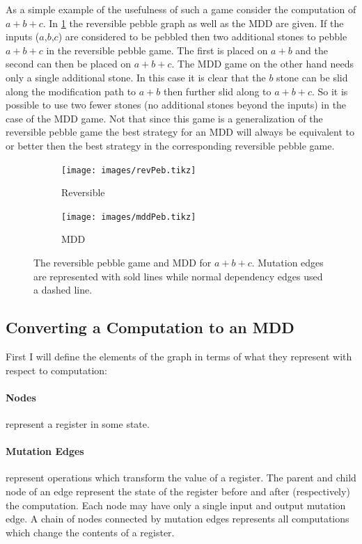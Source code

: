 As a simple example of the usefulness of such a game consider the computation
of $a+b+c$. In \cref{fig:mddExample} the reversible pebble graph as well as the
MDD are given. If the inputs ($a$,$b$,$c$) are considered to be pebbled then
two additional stones to pebble $a+b+c$ in the reversible pebble game. The
first is placed on $a+b$ and the second can then be placed on $a+b+c$. The MDD
game on the other hand needs only a single additional stone. In this case it is
clear that the $b$ stone can be slid along the modification path to $a+b$ then
further slid along to $a+b+c$. So it is possible to use two fewer stones (no
additional stones beyond the inputs) in the case of the MDD game.  Not that
since this game is a generalization of the reversible pebble game the best
strategy for an MDD will always be equivalent to or better then the best
strategy in the corresponding reversible pebble game.

\begin{figure}
  \centering
  \begin{subfigure}{0.3\textwidth}
    \texttt{[image: images/revPeb.tikz]}
    \caption{Reversible}
  \end{subfigure}
  \qquad\qquad
  \begin{subfigure}{0.3\textwidth}
    \texttt{[image: images/mddPeb.tikz]}
    \caption{MDD}
  \end{subfigure}
  \label{fig:mddExample}
  \caption{The reversible pebble game and MDD for $a+b+c$. Mutation edges are
  represented with sold lines while normal dependency edges used a dashed line.}
\end{figure}


\subsection{Converting a Computation to an MDD}

First I will define the elements of the graph in terms of what they represent
with respect to computation:

\paragraph{Nodes} represent a register in some state.

\paragraph{Mutation Edges} represent operations which transform the value
of a register. The parent and child node of an edge represent the state of the
register before and after (respectively) the computation. Each node may have
only a single input and output mutation edge. A chain of nodes connected by
mutation edges represents all computations which change the contents of a
register.

